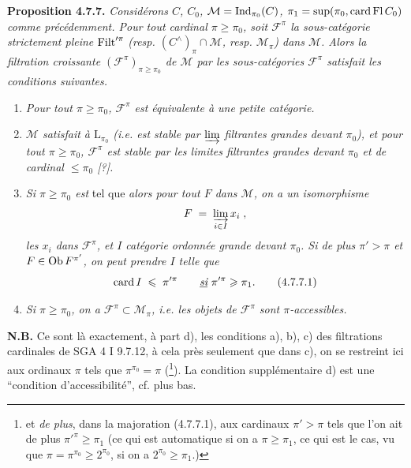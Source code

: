 \textbf{Proposition 4.7.7.} \textit{Considérons $C$, $C_0$, $\mathcal{M} = \operatorname{Ind}_{\pi_0}(C)$, $\pi_1 = \sup(\pi_0, \operatorname{card} \mathrm{Fl}\, C_0)$ comme précédemment. Pour tout cardinal $\pi \geqslant \pi_0$, soit $\mathcal{F}^{\pi}$ la sous-catégorie strictement pleine} $\operatorname{Filt}'^{\pi}$ \textit{(resp. $(C^{\wedge})_{\pi} \cap \mathcal{M}$, resp. $\mathcal{M}_{\pi}$) dans $\mathcal{M}$. Alors la filtration croissante $(\mathcal{F}^{\pi})_{\pi \geqslant \pi_0}$ de $\mathcal{M}$ par les sous-catégories $\mathcal{F}^{\pi}$ satisfait les conditions suivantes.}
\begin{enumerate}
\item[\textit{a)}] \textit{Pour tout $\pi \geqslant \pi_0$, $\mathcal{F}^{\pi}$ est équivalente à une petite catégorie.}
\item[\textit{b)}] \textit{$\mathcal{M}$ satisfait à $\mathrm{L}_{\pi_0}$ (i.e. est stable par $\varinjlim$ filtrantes grandes devant $\pi_0$), et pour tout $\pi \geqslant \pi_0$, $\mathcal{F}^{\pi}$ est stable par les limites filtrantes grandes devant $\pi_0$ et de cardinal $\leqslant \pi_0$ [?].}
\item[\textit{c)}] \textit{Si $\pi \geqslant \pi_0$ est} tel que  \textit{alors pour tout $F$ dans $\mathcal{M}$, on a un isomorphisme}
\[
F \;=\; \varinjlim_{i \in I} x_i \;,
\]
\textit{les $x_i$ dans $\mathcal{F}^{\pi}$, et $I$ catégorie ordonnée grande devant $\pi_0$. Si de plus $\pi' > \pi$ et $F \in \operatorname{Ob} F^{\pi'}$, on peut prendre $I$ telle que} %
\[
\operatorname{card} I \;\leqslant\; \pi'^{\pi} \qquad \underline{\textit{si}}\ \pi'^{\pi} \geqslant \pi_1. \tag*{(4.7.7.1)}
\]
\item[\textit{d)}] \textit{Si $\pi \geqslant \pi_0$, on a $\mathcal{F}^{\pi} \subset \mathcal{M}_{\pi}$, i.e. les objets de $\mathcal{F}^{\pi}$ sont $\pi$-accessibles.}
\end{enumerate}
\textbf{N.B.} Ce sont là exactement, à part d), les conditions a), b), c) des filtrations cardinales de SGA 4 I 9.7.12,  à cela près seulement que dans c), on se restreint ici aux ordinaux $\pi$ tels que $\pi^{\pi_0} = \pi$ (\footnote[72]{et \textit{de plus}, dans la majoration (4.7.7.1), aux cardinaux $\pi' > \pi$ tels que l’on ait de plus $\pi'^{\pi} \geqslant \pi_1$ (ce qui est automatique si on a $\pi \geqslant \pi_1$, ce qui est le cas, vu que $\pi = \pi^{\pi_0} \geqslant 2^{\pi_0}$, si on a $2^{\pi_0} \geqslant \pi_1$.)}). La condition supplémentaire d) est une “condition d’accessibilité”, cf. plus bas.

